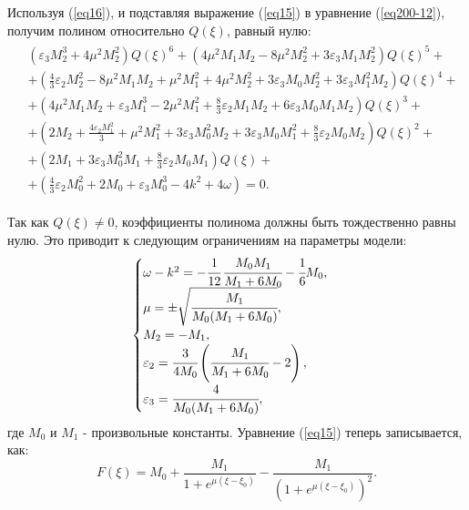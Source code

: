 \documentclass[14pt,a4paper]{extreport}
\begin{document}
			Используя (\ref{eq16}), и подставляя выражение (\ref{eq15}) в уравнение (\ref{eq200-12}), получим полином относительно \(Q(\xi)\), равный нулю:
			\begin{equation}
				\begin{aligned}
					\begin{split}
					&\left(\varepsilon_{3} M_{2}^{3}+4 \mu^{2} M_{2}^{2}\right) Q(\xi)^{6}+
					\left(4 \mu^{2} M_{1} M_{2}-8 \mu^{2} M_{2}^{2}+3 \varepsilon_{3} M_{1} M_{2}^{2}\right) Q(\xi)^{5}+\\
					&+\left(\frac{4}{3} \varepsilon_{2} M_{2}^{2}-8 \mu^{2} M_{1} M_{2}+\mu^{2} M_{1}^{2}+4 \mu^{2} M_{2}^{2}+3 \varepsilon_{3} M_{0} M_{2}^{2}+3 \varepsilon_{3} M_{1}^{2} M_{2}\right) Q(\xi)^{4}+\\
					&+\left(4 \mu^{2} M_{1} M_{2}+\varepsilon_{3} M_{1}^{3}-2 \mu^{2} M_{1}^{2}+\frac{8}{3} \varepsilon_{2} M_{1} M_{2}+6 \varepsilon_{3} M_{0} M_{1} M_{2}\right) Q(\xi)^{3}+\\
					&+\left(2 M_{2}+\frac{4 \varepsilon_{2} M_{1}^{2}}{3 }+\mu^{2} M_{1}^{2}+3 \varepsilon_{3} M_{0}^{2} M_{2}+3 \varepsilon_{3} M_{0} M_{1}^{2}+\frac{8}{3 } \varepsilon_{2} M_{0} M_{2}\right) Q(\xi)^{2}+\\
					&+\left(2 M_{1}+3 \varepsilon_{3} M_{0}^{2} M_{1}+\frac{8}{3} \varepsilon_{2} M_{0} M_{1}\right) Q(\xi)+\\
					&+\left(\frac{4}{3} \varepsilon_{2} M_{0}^{2}+2 M_{0}+\varepsilon_{3} M_{0}^{3}-4 k^{2}+4 \omega\right)=0.
					\end{split}
				\end{aligned}
			\end{equation}

			Так как \(Q(\xi) \neq 0\), коэффициенты полинома должны быть тождественно равны нулю. Это приводит к следующим ограничениям на параметры модели:
			\begin{equation}\label{eq19}
				\begin{cases}
				\omega-k^{2} = -\cfrac{1}{12}\,\cfrac{M_{0} M_{1}}{M_{1}+6M_{0}} -\cfrac{1}{6} M_{0},\\
				\mu=\pm \sqrt{\cfrac{M_{1}}{M_{0}(M_{1}+6M_{0})}},\\
				M_{2}=-M_{1},\\
				\varepsilon_{2} = \cfrac{3}{4 M_{0}}\left(\cfrac{M_{1}}{M_{1}+6M_{0}}-2\right),\\
				\varepsilon_{3}= \cfrac{4}{M_{0}(M_{1}+6M_{0})},
				\end{cases}
			\end{equation}
			где \(M_{0}\) и \(M_{1}\) - произвольные константы. Уравнение (\ref{eq15}) теперь записывается, как:
			\begin{equation}
				F(\xi)=M_{0}+\frac{M_{1}}{1+e^{\mu(\xi-\xi_{0})}}-\frac{M_{1}}{\left(1+e^{\mu(\xi-\xi_{0})}\right)^{2}}.
			\end{equation}
\end{document}
